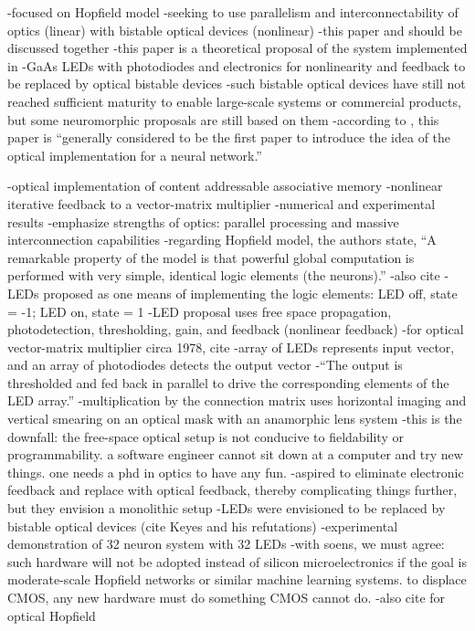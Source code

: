 \cite{psfa1985}
-focused on Hopfield model 
-seeking to use parallelism and interconnectability of optics (linear) with bistable optical devices (nonlinear)
-this paper and \cite{faps1985} should be discussed together
-this paper is a theoretical proposal of the system implemented in \cite{faps1985}
-GaAs LEDs with photodiodes and electronics for nonlinearity and feedback to be replaced by optical bistable devices
-such bistable optical devices have still not reached sufficient maturity to enable large-scale systems or commercial products, but some neuromorphic proposals are still based on them
-according to \cite{juyu1996}, this paper is ``generally considered to be the first paper to introduce the idea of the optical implementation for a neural network.'' \cite{juyu1996}

\cite{faps1985}
-optical implementation of content addressable associative memory
-nonlinear iterative feedback to a vector-matrix multiplier
-numerical and experimental results
-emphasize strengths of optics: parallel processing and massive interconnection capabilities
-regarding Hopfield model, the authors state, ``A remarkable property of the model is that powerful global computation is performed with very simple, identical logic elements (the neurons).''
-also cite \cite{psfa1985}
-LEDs proposed as one means of implementing the logic elements: LED off, state = -1; LED on, state = 1
-LED proposal uses free space propagation, photodetection, thresholding, gain, and feedback (nonlinear feedback)
-for optical vector-matrix multiplier circa 1978, cite \cite{godi1978}
-array of LEDs represents input vector, and an array of photodiodes detects the output vector
-``The output is thresholded and fed back in parallel to drive the corresponding elements of the LED array.''
-multiplication by the connection matrix uses horizontal imaging and vertical smearing on an optical mask with an anamorphic lens system
-this is the downfall: the free-space optical setup is not conducive to fieldability or programmability. a software engineer cannot sit down at a computer and try new things. one needs a phd in optics to have any fun.
-aspired to eliminate electronic feedback and replace with optical feedback, thereby complicating things further, but they envision a monolithic setup
-LEDs were envisioned to be replaced by bistable optical devices (cite Keyes and his refutations)
-experimental demonstration of 32 neuron system with 32 LEDs
-with soens, we must agree: such hardware will not be adopted instead of silicon microelectronics if the goal is moderate-scale Hopfield networks or similar machine learning systems. to displace CMOS, any new hardware must do something CMOS cannot do.
-also cite \cite{jaju1988} for optical Hopfield

